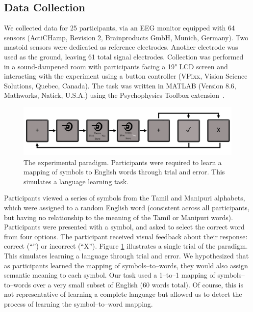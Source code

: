   \subsection{Data Collection}
  We collected data for 25 participants, via an EEG monitor equipped with 64 sensors (ActiCHamp, Revision 2, Brainproducts GmbH, Munich, Germany). Two mastoid sensors were dedicated as reference electrodes. Another electrode was used as the ground, leaving 61 total signal electrodes. Collection was performed in a sound-dampened room with participants facing a 19" LCD screen and interacting with the experiment using a button controller (VPixx, Vision Science Solutions, Quebec, Canada). The task was written in MATLAB (Version 8.6, Mathworks, Natick, U.S.A.) using the Psychophysics Toolbox extension~\cite{brainard1997psychophysics}.

  \begin{figure}[t]
    \centering
    \includegraphics[width=\linewidth]{figures/experiment}
    \caption{The experimental paradigm. Participants were required to learn a mapping of symbols to English words through trial and error. This simulates a language learning task.}
    \label{fig:experiment}
  \end{figure}

  Participants viewed a series of symbols from the Tamil and Manipuri alphabets, which were assigned to a random English word (consistent across all participants, but having no relationship to the meaning of the Tamil or Manipuri words).  Participants were presented with a symbol, and asked to select the correct word from four options. The participant received visual feedback about their response: correct (``\CheckmarkBold'') or incorrect (``X''). Figure \ref{fig:experiment} illustrates a single trial of the paradigm. This simulates learning a language through trial and error. We hypothesized that as participants learned the mapping of symbols--to--words, they would also assign semantic meaning to each symbol. Our task used a 1--to--1 mapping of symbols--to--words over a very small subset of English (60 words total). Of course, this is not representative of learning a complete language but allowed us to detect the process of learning the symbol--to--word mapping.
  

